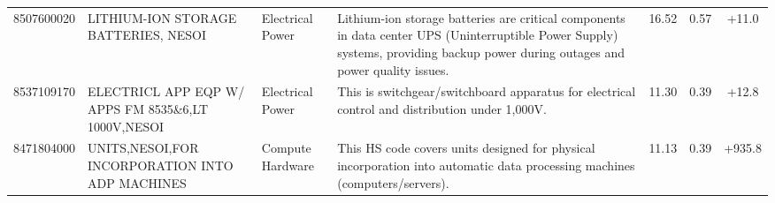 \begin{landscape}
\begin{table}[htbp]
\begin{tabular}{lp{4cm}lp{6cm}ccc}
8507600020 & {\scriptsize LITHIUM-ION STORAGE BATTERIES, NESOI} & Electrical Power & {\scriptsize Lithium-ion storage batteries are critical components in data center UPS (Uninterruptible Power Supply) systems, providing backup power during outages and power quality issues.} & 16.52 & 0.57 & +11.0 \\
8537109170 & {\scriptsize ELECTRICL APP EQP W/ APPS FM 8535\&6,LT 1000V,NESOI} & Electrical Power & {\scriptsize This is switchgear/switchboard apparatus for electrical control and distribution under 1,000V.} & 11.30 & 0.39 & +12.8 \\
8471804000 & {\scriptsize UNITS,NESOI,FOR INCORPORATION INTO ADP MACHINES} & Compute Hardware & {\scriptsize This HS code covers units designed for physical incorporation into automatic data processing machines (computers/servers).} & 11.13 & 0.39 & +935.8 \\
\bottomrule
\end{tabular}
\end{table}
\end{landscape}

